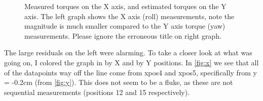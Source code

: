 \documentclass[preprint,12pt,3p]{elsarticle}
\begin{document}
\begin{figure}[H]
    \centering 
        \hfil %
        \hfil
        \caption{Measured torques on the X axis, and estimated torques on the Y axis.
            The left graph shows the X axis (roll) measurements, note the magnitude is much smaller
        compared to the Y axis torque (yaw) measurements. Please ignore the erroneous title on right graph.}
\end{figure}


The large residuals on the left were alarming. To take a closer look at what was going on, I colored
the graph in by X and by Y positions. In \cref{fig:x} we see that all of the datapoints way off the
line come from xpos4 and xpos5, specifically from y = -0.2cm (from  \cref{fig:y}). This does not
seem to be a fluke, as these are not sequential measurements (positions 12 and 15 respectively).
\end{document}
